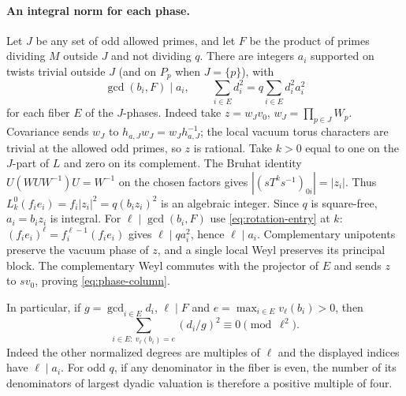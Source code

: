 \documentclass[11pt]{amsart}
\numberwithin{equation}{section}
\theoremstyle{definition}
\theoremstyle{plain}
\begin{document}
\paragraph{An integral norm for each phase.}
Let $J$ be any set of odd allowed primes, and let $F$ be the product
of primes dividing $M$ outside $J$ and not dividing $q$. There are
integers $a_i$ supported on twists trivial outside $J$ (and on
$P_p$ when $J=\{p\}$), with
\begin{equation}\label{eq:phase-column}
 \gcd(b_i,F)\mid a_i,\qquad
 \sum_{i\in E} d_i^2=q\sum_{i\in E} d_i^2a_i^2
\end{equation}
for each fiber $E$ of the $J$-phases. Indeed take
$z=w_Jv_0$, $w_J=\prod_{p\in J}W_p$. Covariance sends $w_J$ to
$h_{a,J}w_J=w_Jh_{a,J}^{-1}$; the local vacuum torus characters
are trivial at the allowed odd primes, so $z$ is rational.
Take $k>0$ equal to one on the $J$-part of $L$ and zero on
its complement. The Bruhat identity
$U(WUW^{-1})U=W^{-1}$ on the chosen factors gives
$|(sT^ks^{-1})_{0i}|=|z_i|$. Thus
$L_k^0(f_i e_i)=f_i|z_i|^2=q(b_i z_i)^2$ is an algebraic integer.
Since $q$ is square-free, $a_i=b_i z_i$ is integral. For
$\ell\mid\gcd(b_i,F)$ use \eqref{eq:rotation-entry} at $k$:
$(f_ie_i)^\ell=f_i^{\ell-1}(f_ie_i)$ gives
$\ell\mid q a_i^2$, hence $\ell\mid a_i$. Complementary unipotents
preserve the vacuum phase of $z$, and a single local Weyl preserves its
principal block. The complementary Weyl commutes with the projector
of $E$ and sends $z$ to $sv_0$, proving \eqref{eq:phase-column}.

In particular, if $g=\gcd_{i\in E}d_i$, $\ell\mid F$ and
$e=\max_{i\in E}v_\ell(b_i)>0$, then
\[
 \sum_{i\in E:\ v_\ell(b_i)=e}(d_i/g)^2\equiv0\pmod{\ell^2}.
\]
Indeed the other normalized degrees are multiples of $\ell$ and the
displayed indices have $\ell\mid a_i$. For odd $q$, if any denominator
in the fiber is even, the number of its denominators of largest dyadic
valuation is therefore a positive multiple of four.
\end{document}

